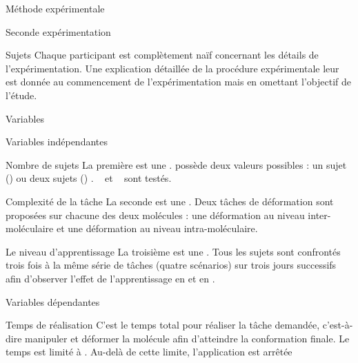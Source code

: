 \documentclass[myfrancais]{mythesis}
\begin{document}
\begin{mychapter}{Méthode expérimentale}
\begin{mysection}{Seconde expérimentation}
\begin{mysubsection}{Sujets}
				Chaque participant est complètement naïf concernant les détails de l'expérimentation.
				Une explication détaillée de la procédure expérimentale leur est donnée au commencement de l'expérimentation mais en omettant l'objectif de l'étude.
			\end{mysubsection}
			\begin{mysubsection}{Variables}
				\begin{mysubsubsection}{Variables indépendantes}
					\begin{myparagraph}{ Nombre de sujets}
						La première  est une .
						 possède deux valeurs possibles : \og un sujet (\mycf {}) \fg ou \og deux sujets (\mycf {}) \fg.
						\mynum{12}~ et ~ sont testés.
					\end{myparagraph}
					\begin{myparagraph}{ Complexité de la tâche}
						La seconde  est une .
						Deux tâches de déformation sont proposées sur chacune des deux molécules : une déformation au niveau inter-moléculaire et une déformation au niveau intra-moléculaire.
					\end{myparagraph}
					\begin{myparagraph}{ Le niveau d'apprentissage}
						La troisième  est une .
						Tous les sujets sont confrontés trois fois à la même série de tâches (quatre scénarios) sur trois jours successifs afin d'observer l'effet de l'apprentissage en  et en .
					\end{myparagraph}
				\end{mysubsubsection}
				\begin{mysubsubsection}{Variables dépendantes}
					\begin{myparagraph}{ Temps de réalisation}
						C'est le temps total pour réaliser la tâche demandée, c'est-à-dire manipuler et déformer la molécule afin d'atteindre la conformation finale.
						Le temps est limité à .
						Au-delà de cette limite, l'application est arrêtée

\end{myparagraph}
\end{mysubsubsection}
\end{mysubsection}
\end{mysection}
\end{mychapter}
\end{document}
